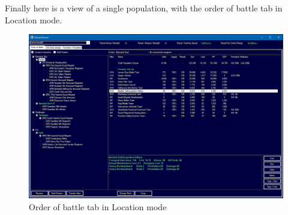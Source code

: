 \documentclass[../../Aurora C# unofficial manual.tex]{subfiles}
\begin{document}
	Finally here is a view of a single population, with the order of battle tab in Location mode.
	\begin{figure}[H]
		\centering
		\includegraphics[width=0.95\linewidth]{images/SupplyVehicle4}
		\caption[Supply Vehicle]{Order of battle tab in Location mode}
		\label{fig:supplyvehicle4}
	\end{figure}
\end{document}
